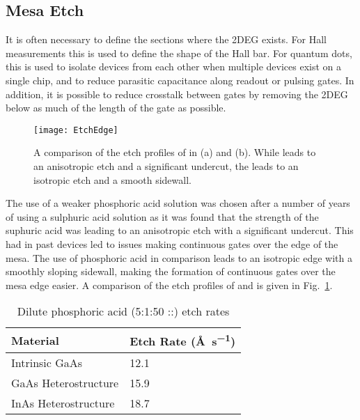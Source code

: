 \subsection{Mesa Etch}
\label{sec:mesaetch}
It is often necessary to define the sections where the 2DEG exists. For Hall measurements this is used to define the shape of the Hall bar.
For quantum dots, this is used to isolate devices from each other when multiple devices exist on a single chip, and to reduce parasitic
capacitance along readout or pulsing gates. In addition, it is possible to reduce crosstalk between gates by removing the 2DEG below
as much of the length of the gate as possible\cite{doi:10.1063/1.4752863}.

\begin{figure}
    \texttt{[image: EtchEdge]}
    \caption[Etch profile of  and ]
    {\label{fig:etchedge}A comparison of the etch profiles of  in (a) and  (b). While  leads
    to an anisotropic etch and a significant undercut, the  leads to an isotropic etch and a smooth sidewall.}
\end{figure}

The use of a weaker phosphoric acid solution was chosen after a number of years of using a sulphuric acid solution as it was found that the
strength of the suphuric acid was leading to an anisotropic etch with a significant undercut. This had in past devices led to issues making
continuous gates over the edge of the mesa. The use of phosphoric acid in comparison leads to
an isotropic edge with a smoothly sloping sidewall, making the formation of continuous gates over the mesa edge easier.
A comparison of the etch profiles of  and  is given in Fig.~\ref{fig:etchedge}.

\begin{table}
    \centering
    \begin{tabular}{ll}
        \toprule
        Material & Etch Rate (\si{\angstrom\per\second}) \\
        \midrule
        Intrinsic GaAs & 12.1 \\
        GaAs Heterostructure & 15.9 \\
        InAs Heterostructure & 18.7 \\
        \bottomrule
    \end{tabular}
    \caption[Dilute phosphoric acid (5:1:50 ::) etch rates]
    {Dilute phosphoric acid (5:1:50 ::) etch rates}
    \label{tab:etchratess}
\end{table}


